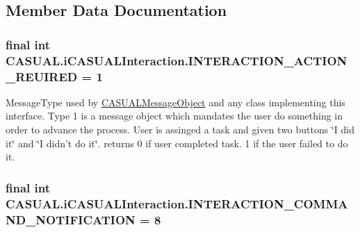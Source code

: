 \subsection{Member Data Documentation}
\hypertarget{interfaceCASUAL_1_1iCASUALInteraction_a9cb2accb41f6b2de8f8076cda916924f}{
\subsubsection[{I\-N\-T\-E\-R\-A\-C\-T\-I\-O\-N\-\_\-\-A\-C\-T\-I\-O\-N\-\_\-\-R\-E\-U\-I\-R\-E\-D}]{\setlength{\rightskip}{0pt plus 5cm}final int C\-A\-S\-U\-A\-L.\-i\-C\-A\-S\-U\-A\-L\-Interaction.\-I\-N\-T\-E\-R\-A\-C\-T\-I\-O\-N\-\_\-\-A\-C\-T\-I\-O\-N\-\_\-\-R\-E\-U\-I\-R\-E\-D = 1}}\label{interfaceCASUAL_1_1iCASUALInteraction_a9cb2accb41f6b2de8f8076cda916924f}
Message\-Type used by \hyperlink{classCASUAL_1_1CASUALMessageObject}{C\-A\-S\-U\-A\-L\-Message\-Object} and any class implementing this interface. Type 1 is a message object which mandates the user do something in order to advance the process. User is assinged a task and given two buttons \char`\"{}\-I did it\char`\"{} and \char`\"{}\-I didn't do it\char`\"{}. returns 0 if user completed task. 1 if the user failed to do it. \hypertarget{interfaceCASUAL_1_1iCASUALInteraction_a7e7889527c716356d3df6039c1aae7c7}{
\subsubsection[{I\-N\-T\-E\-R\-A\-C\-T\-I\-O\-N\-\_\-\-C\-O\-M\-M\-A\-N\-D\-\_\-\-N\-O\-T\-I\-F\-I\-C\-A\-T\-I\-O\-N}]{\setlength{\rightskip}{0pt plus 5cm}final int C\-A\-S\-U\-A\-L.\-i\-C\-A\-S\-U\-A\-L\-Interaction.\-I\-N\-T\-E\-R\-A\-C\-T\-I\-O\-N\-\_\-\-C\-O\-M\-M\-A\-N\-D\-\_\-\-N\-O\-T\-I\-F\-I\-C\-A\-T\-I\-O\-N = 8}}\label{interfaceCASUAL_1_1iCASUALInteraction_a7e7889527c716356d3df6039c1aae7c7}

